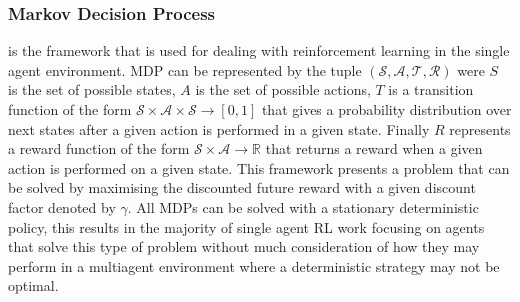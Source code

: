 \documentclass{article}
\begin{document}
\subsubsection{Markov Decision Process} is the framework that is used for dealing with reinforcement
learning in the single agent environment. MDP can be represented by the tuple 
$(\mathcal{S}, \mathcal{A}, \mathcal{T}, \mathcal{R})$ were $S$ is the set of possible
states, $A$ is the set of possible actions, $T$ is a transition function of the form 
$\mathcal{S}\times\mathcal{A}\times\mathcal{S}\rightarrow [0,1]$ that gives a probability
distribution over next states after a given action is performed in a given state. Finally
$R$ represents a reward function of the form $\mathcal{S}\times\mathcal{A}\rightarrow \mathbb{R}$
that returns a reward when a given action is performed on a given state. This framework presents a problem that can be solved by maximising the discounted
future reward with a given discount factor denoted by $\gamma$. All MDPs can be solved
with a stationary deterministic policy, this results in the majority of single agent
RL work focusing on agents that solve this type of problem without much consideration
of how they may perform in a multiagent environment where a deterministic strategy may
not be optimal.

\end{document}
